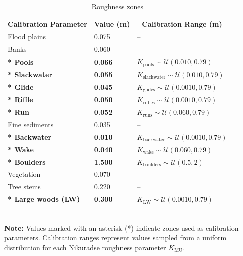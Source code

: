 \documentclass[draft,linenumbers,onecolumn]{agujournal2019} %
\begin{document}
\begin{table}[H]
	\centering
	\caption{Roughness zones}
	\begin{tabular}{p{5.5cm} p{3cm} p{5.5cm}}
		\hline
		\multicolumn{1}{c}{\textbf{Calibration Parameter}} & 
		\multicolumn{1}{c}{\textbf{Value (m)}} & 
		\multicolumn{1}{c}{\textbf{Calibration Range (m)}} \\ \hline
		Flood plains              & 0.075   & -- \\
		Banks                     & 0.060   & -- \\
		\textbf{* Pools}          & \textbf{0.066}   & \( K_{\text{pools}} \sim \mathcal{U}(0.010, 0.79) \) \\
		\textbf{* Slackwater}     & \textbf{0.055}   & \( K_{\text{slackwater}} \sim \mathcal{U}(0.010, 0.79) \) \\
		\textbf{* Glide}          & \textbf{0.045}   & \( K_{\text{glides}} \sim \mathcal{U}(0.0010, 0.79) \) \\
		\textbf{* Riffle}         & \textbf{0.050}   & \( K_{\text{riffles}} \sim \mathcal{U}(0.0010, 0.79) \) \\
		\textbf{* Run}            & \textbf{0.052}   & \( K_{\text{runs}} \sim \mathcal{U}(0.060, 0.79) \) \\
		Fine sediments            & 0.035   & -- \\
		\textbf{* Backwater}      & \textbf{0.010}   & \( K_{\text{backwater}} \sim \mathcal{U}(0.0010, 0.79) \) \\
		\textbf{* Wake}           & \textbf{0.040}   & \( K_{\text{wake}} \sim \mathcal{U}(0.060, 0.79) \) \\
		\textbf{* Boulders}       & \textbf{1.500}   & \( K_{\text{boulders}} \sim \mathcal{U}(0.5, 2) \) \\
		Vegetation                & 0.070   & -- \\
		Tree stems                & 0.220   & -- \\
		\textbf{* Large woods (LW)} & \textbf{0.300} & \( K_{\text{LW}} \sim \mathcal{U}(0.0010, 0.79) \) \\ \hline
	\end{tabular}
	\label{tab:roughness_zones}
	\\
	\textbf{Note:} Values marked with an asterisk (*) indicate zones used as calibration parameters. Calibration ranges represent values sampled from a uniform distribution for each Nikuradse roughness parameter \( K_{\text{MU}} \).
\end{table}
\end{document}
